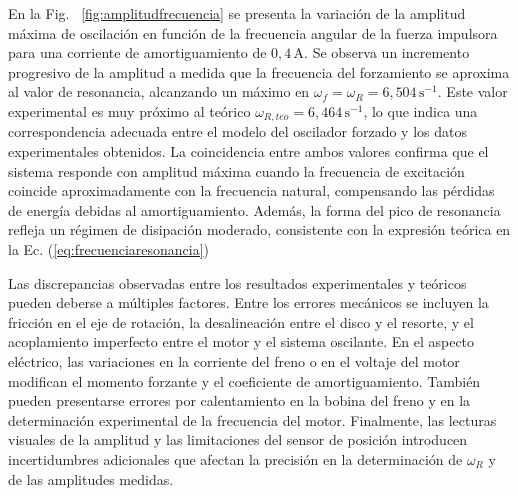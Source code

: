 En la Fig. ~\ref{fig:amplitudfrecuencia} se presenta la variaci\'on de la amplitud m\'axima 
de oscilaci\'on en funci\'on de la frecuencia angular de la fuerza impulsora 
para una corriente de amortiguamiento de \(0{,}4\,\text{A}\). Se observa un 
incremento progresivo de la amplitud a medida que la frecuencia del 
forzamiento se aproxima al valor de resonancia, alcanzando un m\'aximo en 
\(\omega_f = \omega_R = 6{,}504\,\text{s}^{-1}\). Este valor experimental es muy 
pr\'oximo al te\'orico \(\omega_{R,teo} = 6{,}464\,\text{s}^{-1}\), lo que indica 
una correspondencia adecuada entre el modelo del oscilador forzado y los datos 
experimentales obtenidos. La coincidencia entre ambos valores confirma que el 
sistema responde con amplitud m\'axima cuando la frecuencia de excitaci\'on 
coincide aproximadamente con la frecuencia natural, compensando las p\'erdidas 
de energ\'ia debidas al amortiguamiento. Adem\'as, la forma del pico de 
resonancia refleja un r\'egimen de disipaci\'on moderado, consistente con la 
expresi\'on te\'orica en la Ec. (\ref{eq:frecuenciaresonancia})

Las discrepancias observadas entre los resultados experimentales y te\'oricos 
pueden deberse a m\'ultiples factores. Entre los errores mec\'anicos se incluyen 
la fricci\'on en el eje de rotaci\'on, la desalineaci\'on entre el disco y el 
resorte, y el acoplamiento imperfecto entre el motor y el sistema oscilante. En 
el aspecto el\'ectrico, las variaciones en la corriente del freno o en el 
voltaje del motor modifican el momento forzante y el coeficiente de 
amortiguamiento. Tambi\'en pueden presentarse errores por calentamiento en la 
bobina del freno y en la determinaci\'on experimental de la frecuencia del 
motor. Finalmente, las lecturas visuales de la amplitud y las limitaciones del 
sensor de posici\'on introducen incertidumbres adicionales que afectan la 
precisi\'on en la determinaci\'on de \(\omega_R\) y de las amplitudes medidas.
